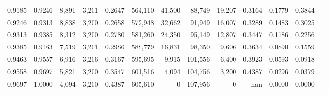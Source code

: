 \begin{tabular}{rrrrrrrrrrrrr}
0.9185 & 0.9246 &  8,891 & 3,201 &                                     0.2647 & 564,110 &  41,500 &  88,749 &  19,207 & 0.3164 & 0.1779 & 0.3844 \\
0.9246 & 0.9313 &  8,838 & 3,200 &                                     0.2658 & 572,948 &  32,662 &  91,949 &  16,007 & 0.3289 & 0.1483 & 0.3025 \\
0.9313 & 0.9385 &  8,312 & 3,200 &                                     0.2780 & 581,260 &  24,350 &  95,149 &  12,807 & 0.3447 & 0.1186 & 0.2256 \\
0.9385 & 0.9463 &  7,519 & 3,201 &                                     0.2986 & 588,779 &  16,831 &  98,350 &   9,606 & 0.3634 & 0.0890 & 0.1559 \\
0.9463 & 0.9557 &  6,916 & 3,206 &                                     0.3167 & 595,695 &   9,915 & 101,556 &   6,400 & 0.3923 & 0.0593 & 0.0918 \\
0.9558 & 0.9697 &  5,821 & 3,200 &                                     0.3547 & 601,516 &   4,094 & 104,756 &   3,200 & 0.4387 & 0.0296 & 0.0379 \\
0.9697 & 1.0000 &  4,094 & 3,200 &                                     0.4387 & 605,610 &       0 & 107,956 &       0 &    nan & 0.0000 & 0.0000 \\
\bottomrule
\end{tabular}
